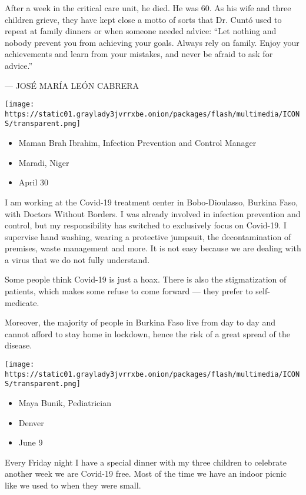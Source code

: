 After a week in the critical care unit, he died. He was 60. As his wife
and three children grieve, they have kept close a motto of sorts that
Dr. Cuntó used to repeat at family dinners or when someone needed
advice: ``Let nothing and nobody prevent you from achieving your goals.
Always rely on family. Enjoy your achievements and learn from your
mistakes, and never be afraid to ask for advice.''

--- JOSÉ MARÍA LEÓN CABRERA

\texttt{[image: https://static01.graylady3jvrrxbe.onion/packages/flash/multimedia/ICONS/transparent.png]}

\begin{itemize}
\tightlist
\item
  Maman Brah Ibrahim, Infection Prevention and Control Manager
\item
  Maradi, Niger
\item
  April 30
\end{itemize}

I am working at the Covid-19 treatment center in Bobo-Dioulasso, Burkina
Faso, with Doctors Without Borders. I was already involved in infection
prevention and control, but my responsibility has switched to
exclusively focus on Covid-19. I supervise hand washing, wearing a
protective jumpsuit, the decontamination of premises, waste management
and more. It is not easy because we are dealing with a virus that we do
not fully understand.

Some people think Covid-19 is just a hoax. There is also the
stigmatization of patients, which makes some refuse to come forward ---
they prefer to self-medicate.

Moreover, the majority of people in Burkina Faso live from day to day
and cannot afford to stay home in lockdown, hence the risk of a great
spread of the disease.

\texttt{[image: https://static01.graylady3jvrrxbe.onion/packages/flash/multimedia/ICONS/transparent.png]}

\begin{itemize}
\tightlist
\item
  Maya Bunik, Pediatrician
\item
  Denver
\item
  June 9
\end{itemize}

Every Friday night I have a special dinner with my three children to
celebrate another week we are Covid-19 free. Most of the time we have an
indoor picnic like we used to when they were small.

